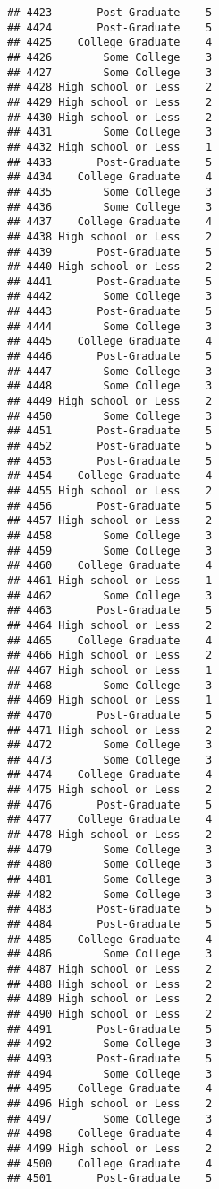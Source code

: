 \documentclass[
]{article}
\begin{document}
\begin{verbatim}
## 4423       Post-Graduate    5
## 4424       Post-Graduate    5
## 4425    College Graduate    4
## 4426        Some College    3
## 4427        Some College    3
## 4428 High school or Less    2
## 4429 High school or Less    2
## 4430 High school or Less    2
## 4431        Some College    3
## 4432 High school or Less    1
## 4433       Post-Graduate    5
## 4434    College Graduate    4
## 4435        Some College    3
## 4436        Some College    3
## 4437    College Graduate    4
## 4438 High school or Less    2
## 4439       Post-Graduate    5
## 4440 High school or Less    2
## 4441       Post-Graduate    5
## 4442        Some College    3
## 4443       Post-Graduate    5
## 4444        Some College    3
## 4445    College Graduate    4
## 4446       Post-Graduate    5
## 4447        Some College    3
## 4448        Some College    3
## 4449 High school or Less    2
## 4450        Some College    3
## 4451       Post-Graduate    5
## 4452       Post-Graduate    5
## 4453       Post-Graduate    5
## 4454    College Graduate    4
## 4455 High school or Less    2
## 4456       Post-Graduate    5
## 4457 High school or Less    2
## 4458        Some College    3
## 4459        Some College    3
## 4460    College Graduate    4
## 4461 High school or Less    1
## 4462        Some College    3
## 4463       Post-Graduate    5
## 4464 High school or Less    2
## 4465    College Graduate    4
## 4466 High school or Less    2
## 4467 High school or Less    1
## 4468        Some College    3
## 4469 High school or Less    1
## 4470       Post-Graduate    5
## 4471 High school or Less    2
## 4472        Some College    3
## 4473        Some College    3
## 4474    College Graduate    4
## 4475 High school or Less    2
## 4476       Post-Graduate    5
## 4477    College Graduate    4
## 4478 High school or Less    2
## 4479        Some College    3
## 4480        Some College    3
## 4481        Some College    3
## 4482        Some College    3
## 4483       Post-Graduate    5
## 4484       Post-Graduate    5
## 4485    College Graduate    4
## 4486        Some College    3
## 4487 High school or Less    2
## 4488 High school or Less    2
## 4489 High school or Less    2
## 4490 High school or Less    2
## 4491       Post-Graduate    5
## 4492        Some College    3
## 4493       Post-Graduate    5
## 4494        Some College    3
## 4495    College Graduate    4
## 4496 High school or Less    2
## 4497        Some College    3
## 4498    College Graduate    4
## 4499 High school or Less    2
## 4500    College Graduate    4
## 4501       Post-Graduate    5

\end{verbatim}
\end{document}
